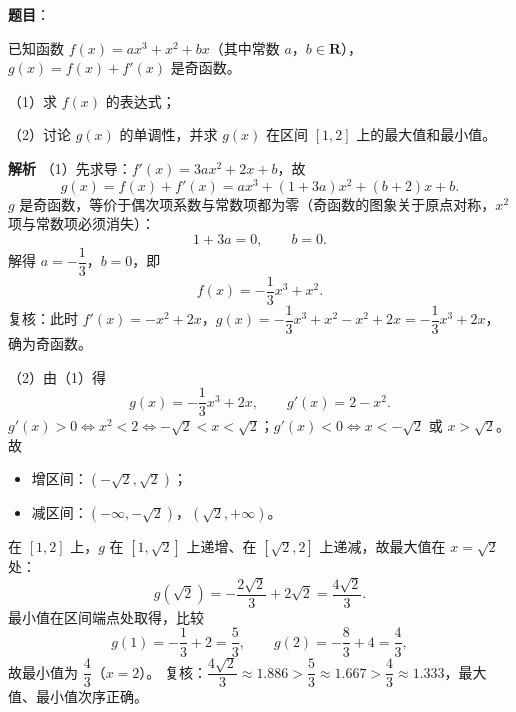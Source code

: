 \begin{answer}

\textbf{题目}：

已知函数 $f(x)=ax^3+x^2+bx$（其中常数 $a$，$b\in\mathbf R$），$g(x)=f(x)+f'(x)$ 是奇函数。

（1）求 $f(x)$ 的表达式；

（2）讨论 $g(x)$ 的单调性，并求 $g(x)$ 在区间 $[1,2]$ 上的最大值和最小值。

\textbf{解析}
（1）先求导：$f'(x)=3ax^2+2x+b$，故
\nopagebreak[4]
\[g(x)=f(x)+f'(x)=ax^3+(1+3a)x^2+(b+2)x+b.\]
$g$ 是奇函数，等价于偶次项系数与常数项都为零（奇函数的图象关于原点对称，$x^2$ 项与常数项必须消失）：
\nopagebreak[4]
\[1+3a=0,\qquad b=0.\]
解得 $a=-\dfrac13$，$b=0$，即
\nopagebreak[4]
\[f(x)=-\frac13x^3+x^2.\]
复核：此时 $f'(x)=-x^2+2x$，$g(x)=-\dfrac13x^3+x^2-x^2+2x=-\dfrac13x^3+2x$，确为奇函数。

（2）由（1）得
\nopagebreak[4]
\[g(x)=-\frac13x^3+2x,\qquad g'(x)=2-x^2.\]
$g'(x)>0\iff x^2<2\iff-\sqrt2<x<\sqrt2$；$g'(x)<0\iff x<-\sqrt2$ 或 $x>\sqrt2$。故
\begin{itemize}
\item 增区间：$\left(-\sqrt2,\sqrt2\right)$；
\item 减区间：$\left(-\infty,-\sqrt2\right)$，$\left(\sqrt2,+\infty\right)$。
\end{itemize}

在 $[1,2]$ 上，$g$ 在 $\left[1,\sqrt2\right]$ 上递增、在 $\left[\sqrt2,2\right]$ 上递减，故最大值在 $x=\sqrt2$ 处：
\nopagebreak[4]
\[g\left(\sqrt2\right)=-\frac{2\sqrt2}{3}+2\sqrt2=\frac{4\sqrt2}{3}.\]
最小值在区间端点处取得，比较
\nopagebreak[4]
\[g(1)=-\frac13+2=\frac53,\qquad g(2)=-\frac83+4=\frac43,\]
故最小值为 $\dfrac43$（$x=2$）。
复核：$\dfrac{4\sqrt2}{3}\approx1.886>\dfrac53\approx1.667>\dfrac43\approx1.333$，最大值、最小值次序正确。


\end{answer}
